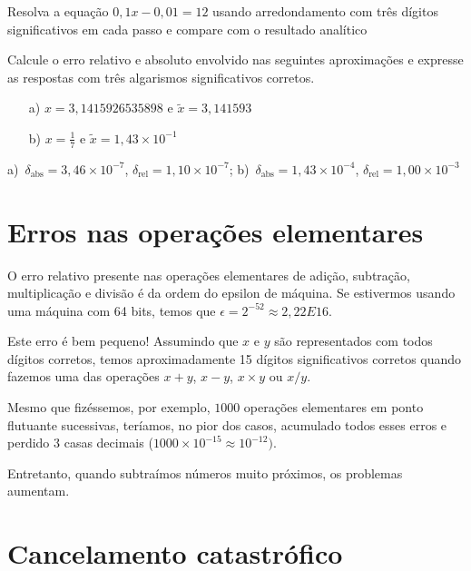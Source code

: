 \begin{exer} Resolva a equação $0,1x-0,01=12$ usando arredondamento com três dígitos significativos em cada passo e compare com o resultado analítico
\end{exer}


\begin{exer} Calcule o erro relativo e absoluto envolvido nas seguintes aproximações e expresse as respostas com três algarismos significativos corretos.
    \begin{itemize}
    \item [a)] $x=3,1415926535898$ e $\tilde{x}=3,141593$
    \item [b)] $x=\frac{1}{7}$ e $\tilde{x}=1,43\times 10^{-1}$
    \end{itemize}
\end{exer}
\begin{resp}
  
    a)~$\delta_{\mbox{abs}}=3,46\times 10^{-7}$, $\delta_{\mbox{rel}}=1,10\times 10^{-7}$; b)~$\delta_{\mbox{abs}}=1,43\times 10^{-4}$, $\delta_{\mbox{rel}} = 1,00 \times 10^{-3}$
  
\end{resp}

\fi

\section{Erros nas operações elementares}
O erro relativo presente nas operações elementares de adição, subtração, multiplicação e divisão é da ordem do epsilon de máquina. Se estivermos usando uma máquina com 64 bits, temos que $\epsilon = 2^{-52} \approx 2,22E16$. 

Este erro é bem pequeno! Assumindo que $x$ e $y$ são representados com todos dígitos corretos, temos aproximadamente 15 dígitos significativos corretos quando fazemos uma das operações $x+y$, $x-y$, $x\times y$ ou $x/y$. 


Mesmo que fizéssemos, por exemplo, $1000$ operações elementares em ponto flutuante sucessivas, teríamos, no pior dos casos, acumulado todos esses erros e perdido $3$ casas decimais ($1000\times 10^{-15} \approx 10^{-12})$.

Entretanto, quando subtraímos números muito próximos, os problemas aumentam.

\section{Cancelamento catastrófico}

